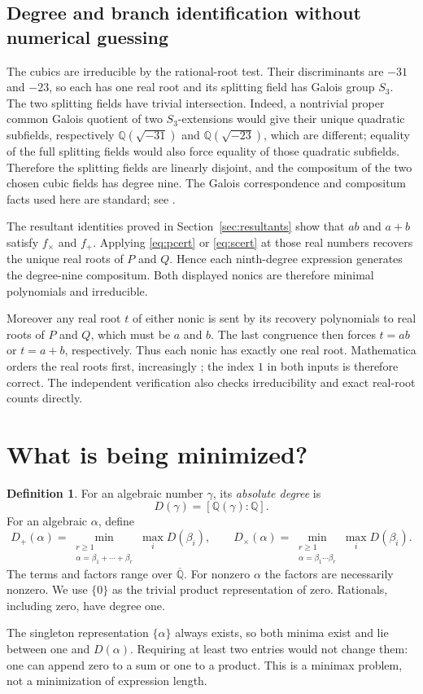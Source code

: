 \documentclass[11pt,letterpaper]{article}
\theoremstyle{definition}
\newtheorem{definition}[theorem]{Definition}
\theoremstyle{remark}
\newcommand{\Q}{\mathbb Q}
\newcommand{\Dplus}{D_{+}}
\newcommand{\Dtimes}{D_{\times}}
\begin{document}
\subsection{Degree and branch identification without numerical guessing}
The cubics are irreducible by the rational-root test. Their discriminants
are \(-31\) and \(-23\), so each has one real root and its splitting field
has Galois group \(S_3\). The two splitting fields have trivial intersection.
Indeed, a nontrivial proper common Galois quotient of two \(S_3\)-extensions
would give their unique quadratic subfields, respectively
\(\Q(\sqrt{-31})\) and \(\Q(\sqrt{-23})\), which are different; equality
of the full splitting fields would also force equality of those quadratic
subfields. Therefore the splitting fields are linearly disjoint, and the
compositum of the two chosen cubic fields has degree nine. The Galois
correspondence and compositum facts used here are standard; see
\cite[Chapters~3--4]{milne}.

The resultant identities proved in Section~\ref{sec:resultants} show that
\(ab\) and \(a+b\) satisfy \(f_\times\) and \(f_+\). Applying
\eqref{eq:pcert} or \eqref{eq:scert} at those real numbers recovers the
unique real roots of \(P\) and \(Q\). Hence each ninth-degree expression
generates the degree-nine compositum. Both displayed nonics are therefore
minimal polynomials and irreducible.

Moreover any real root \(t\) of either nonic is sent by its recovery
polynomials to real roots of \(P\) and \(Q\), which must be \(a\) and
\(b\). The last congruence then forces \(t=ab\) or \(t=a+b\), respectively.
Thus each nonic has exactly one real root. Mathematica orders the real roots
first, increasingly \cite{root}; the index \(1\) in both inputs is therefore
correct. The independent verification also checks irreducibility and exact
real-root counts directly.

\section{What is being minimized?}\label{sec:objective}
\begin{definition}
For an algebraic number \(\gamma\), its \emph{absolute degree} is
\[
 D(\gamma)=[\Q(\gamma):\Q].
\]
For an algebraic \(\alpha\), define
\[
\Dplus(\alpha)=\min_{\substack{r\geq1\\\alpha=\beta_1+\cdots+\beta_r}}
 \max_i D(\beta_i),
\qquad
\Dtimes(\alpha)=\min_{\substack{r\geq1\\\alpha=\beta_1\cdots\beta_r}}
 \max_i D(\beta_i).
\]
The terms and factors range over \(\overline{\Q}\). For nonzero \(\alpha\)
the factors are necessarily nonzero. We use \(\{0\}\) as the trivial product
representation of zero. Rationals, including zero, have degree one.
\end{definition}
The singleton representation \(\{\alpha\}\) always exists, so both minima
exist and lie between one and \(D(\alpha)\). Requiring at least two entries
would not change them: one can append zero to a sum or one to a product.
This is a minimax problem, not a minimization of expression length.
\end{document}
